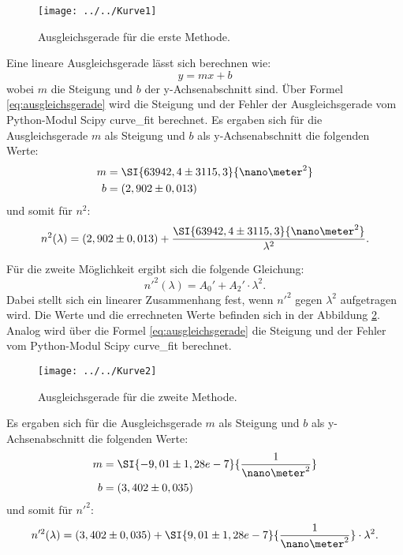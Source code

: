 \begin{figure}[h!]
	\centering
	\texttt{[image: ../../Kurve1]}
	\caption{Ausgleichsgerade für die erste Methode.}
	\label{fig:kurve1}
\end{figure}

Eine lineare Ausgleichsgerade lässt sich berechnen wie:
\begin{equation}
\label{eq:ausgleichsgerade}
y = mx + b
\end{equation}
wobei $m$ die Steigung und $b$ der y-Achsenabschnitt sind. Über Formel \ref{eq:ausgleichsgerade} wird die Steigung und der Fehler der Ausgleichsgerade vom Python-Modul Scipy curve\_fit berechnet.
Es ergaben sich für die Ausgleichsgerade $m$ als Steigung und $b$ als y-Achsenabschnitt die folgenden Werte:
\begin{align*}
m &= \SI{63942,4 \pm 3115,3}{\nano\meter^{2}}\\
b &= (2,902 \pm 0,013)
\end{align*}
und somit für $n^{2}$:
\begin{equation*}
n^{2}(\lambda) = (2,902 \pm 0,013) + \frac{\SI{63942,4 \pm 3115,3}{\nano\meter^{2}}}{\lambda^{2}}.
\end{equation*}

Für die zweite Möglichkeit ergibt sich die folgende Gleichung:
\begin{equation}
\label{eq:second}
n'^{2}(\lambda) = A_0' + A_2' \cdot \lambda^{2}.
\end{equation}
Dabei stellt sich ein linearer Zusammenhang fest, wenn $n'^{2}$ gegen $\lambda^{2}$ aufgetragen wird. Die Werte und die errechneten Werte befinden sich in der Abbildung \ref{fig:kurve2}. Analog wird über die Formel \ref{eq:ausgleichsgerade} die Steigung und der Fehler vom Python-Modul Scipy curve\_fit berechnet.

\begin{figure}[h!]
	\centering
	\texttt{[image: ../../Kurve2]}
	\caption{Ausgleichsgerade für die zweite Methode.}
	\label{fig:kurve2}
\end{figure}

Es ergaben sich für die Ausgleichsgerade $m$ als Steigung und $b$ als y-Achsenabschnitt die folgenden Werte:
\begin{align*}
m &= \SI{-9,01\pm 1,28 e-7}{\frac{1}{\nano\meter^{2}}}\\
b &= (3,402 \pm 0,035)
\end{align*}
und somit für $n'^{2}$:
\begin{equation*}
n'^{2}(\lambda) = (3,402 \pm 0,035) + \SI{9,01\pm 1,28 e-7}{\frac{1}{\nano\meter^{2}}} \cdot \lambda^{2}.
\end{equation*}

